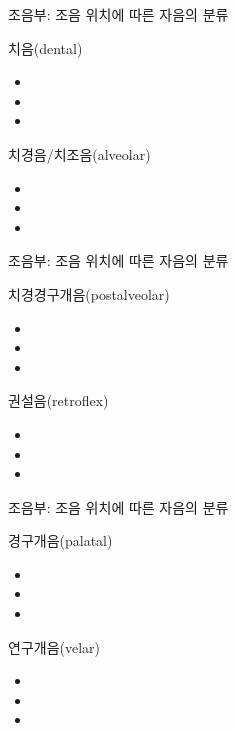 \documentclass[11pt, aspectratio=169]{beamer}
\begin{document}
\begin{frame}[t]{조음부: 조음 위치에 따른 자음의 분류}
    \begin{block}{치음(dental)}
        \begin{itemize}
            \item 
            \item 
            \item 
        \end{itemize}
    \end{block}
    \begin{block}{치경음/치조음(alveolar)}
        \begin{itemize}
            \item 
            \item 
            \item 
        \end{itemize}
    \end{block}

\end{frame}

\begin{frame}[t]{조음부: 조음 위치에 따른 자음의 분류}
    \begin{block}{치경경구개음(postalveolar)}
        \begin{itemize}
            \item 
            \item 
            \item 
        \end{itemize}
    \end{block}
    \begin{block}{권설음(retroflex)}
        \begin{itemize}
            \item 
            \item 
            \item 
        \end{itemize}
    \end{block}

\end{frame}

\begin{frame}[t]{조음부: 조음 위치에 따른 자음의 분류}
    \begin{block}{경구개음(palatal)}
        \begin{itemize}
            \item 
            \item 
            \item 
        \end{itemize}
    \end{block}
    \begin{block}{연구개음(velar)}
        \begin{itemize}
            \item 
            \item 
            \item 
        \end{itemize}
    \end{block}

\end{frame}
\end{document}
